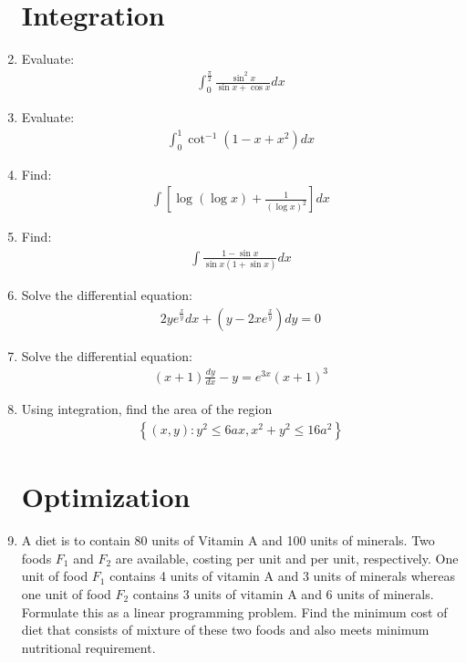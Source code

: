 \documentclass[12pt,-letter paper]{article}
\providecommand{\sbrak}[1]{\ensuremath{{}\left[#1\right]}}
\providecommand{\brak}[1]{\ensuremath{\left(#1\right)}}
\providecommand{\cbrak}[1]{\ensuremath{\left\{#1\right\}}}
\theoremstyle{remark}
\begin{document}
\begin{enumerate}
\section{Integration}
\item Evaluate: 
\begin{align*}
\int_0^\frac{\pi}{2} \frac{\sin^{2}x}{\sin x + \cos x} dx
\end{align*}
\item Evaluate:
\begin{align*}
\int_0^1 \cot^{-1}\brak{1 - x + x^{2}} dx
\end{align*}
\item Find: 
\begin{align*}
\int \sbrak{\log\brak{\log x} + \frac{1}{\brak{\log x}^{2}}} dx
\end{align*}
\item Find: 
\begin{align*}
\int \frac{1 - \sin x}{\sin x \brak{1 + \sin x}}dx
\end{align*}
\item Solve the differential equation: 
\begin{align*}
2y e^{\frac{x}{y}}dx + \brak{y - 2xe^{\frac{x}{y}}}dy = 0
\end{align*}
\item Solve the differential equation: 
\begin{align*}
\brak{x + 1} \frac{dy}{dx} - y = e^{3x}\brak{x + 1}^{3}
\end{align*}
\item Using integration, find the area of the region 
\begin{align*}
\cbrak{\brak{x,y} : y^{2} \leq 6ax, x^{2} + y^{2} \leq 16a^{2}}
\end{align*}
\section{Optimization}
\item A diet is to contain 80 units of Vitamin A and 100 units of minerals. Two foods $F_1$ and $F_2$ are available, costing  per unit and  per unit, respectively. One unit of food $F_1$ contains 4 units of vitamin A and 3 units of minerals whereas one unit of food $F_2$ contains 3 units of vitamin A and 6 units of minerals. Formulate this as a linear programming problem. Find the minimum cost of diet that consists of mixture of these two foods and also meets minimum nutritional requirement.
\end{enumerate}
\end{document}

